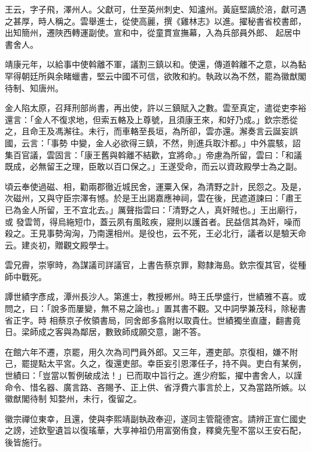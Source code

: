 \begin{pinyinscope}
 王云，字子飛，澤州人。父獻可，仕至英州刺史、知瀘州。黃庭堅謫於涪，獻可遇之甚厚，時人稱之。雲舉進士，從使高麗，撰《雞林志》以進。擢秘書省校書郎，出知簡州，遷陜西轉運副使。宣和中，從童貫宣撫幕，入為兵部員外郎、
 起居中書舍人。



 靖康元年，以給事中使斡離不軍，議割三鎮以和。使還，傳道斡離不之意，以為黏罕得朝廷所與余睹蠟書，堅云中國不可信，欲敗和約。執政以為不然，罷為徽猷閣待制、知唐州。



 金人陷太原，召拜刑部尚書，再出使，許以三鎮賦入之數。雲至真定，遣從吏李裕還言：「金人不復求地，但索五輅及上尊號，且須康王來，和好乃成。」欽宗悉從之，且命王及馮澥往。未行，而車輅至長垣，為所卻，雲亦還。澥奏言云誕妄誤國，云言：「事勢
 中變，金人必欲得三鎮，不然，則進兵取汴都。」中外震駭，詔集百官議，雲固言：「康王舊與斡離不結歡，宜將命。」帝慮為所留，雲曰：「和議既成，必無留王之理，臣敢以百口保之。」王遂受命，而云以資政殿學士為之副。



 頃云奉使過磁、相，勸兩郡徹近城民舍，運粟入保，為清野之計，民怨之。及是，次磁州，又與守臣宗澤有憾。於是王出謁嘉應神祠，雲在後，民遮道諫曰：「肅王已為金人所留，王不宜北去。」厲聲指雲曰：「清野之人，真奸賊也。」王出廟行，或
 發雲笥，得烏絁短巾，蓋云夙有風眩疾，寢則以護首者。民益信其為奸，噪而殺之。王見事勢洶洶，乃南還相州。是役也，云不死，王必北行，議者以是驗天命云。建炎初，贈觀文殿學士。



 雲兄霽，崇寧時，為謀議司詳議官，上書告蔡京罪，黥隸海島。欽宗復其官，從種師中戰死。



 譚世績字彥成，潭州長沙人。第進士，教授郴州。時王氏學盛行，世績雅不喜。或問之，曰：「說多而屢變，無不易之論也。」置其書不觀。又中詞學兼茂科，除秘書省正字。時
 相蔡京子攸領書局，同舍郎多翕附以取貴仕。世績獨坐直廬，翻書竟日。梁師成之客與為鄰居，數致師成願交意，謝不答。



 在館六年不遷，京罷，用久次為司門員外郎。又三年，遷吏部。京復相，嫌不附己，罷提點太平宮。久之，復還吏部。幸臣妄引恩澤任子，持不與。吏白有某例，世績曰：「豈當以暫例破成法！」已而取中旨行之。進少府監，擢中書舍人，以謹命令、惜名器、廣言路、吝賜予、正上供、省浮費六事言於上，又為當路所嫉。以徽猷閣待制
 知婺州，未行，復留之。



 徽宗禪位東幸，且還，使與李熙靖副執政奉迎，遂同主管龍德宮。請辨正宣仁國史之謗，述欽聖遺旨以復瑤華，大享神祖仍用富弼侑食，釋奠先聖不當以王安石配，後皆施行。




\end{pinyinscope}
